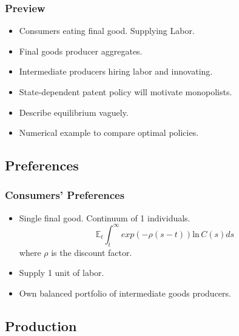 \documentclass{beamer}
\begin{document}
\begin{frame}[t]\frametitle{Preview}
    
\begin{itemize}
  \item<+-> Consumers eating final good. Supplying Labor.
  \item<+-> Final goods producer aggregates.
  \item<+-> Intermediate producers hiring labor and innovating.
  \item<+-> State-dependent patent policy will motivate monopolists.
  \item<+-> Describe equilibrium vaguely.
  \item<+-> Numerical example to compare optimal policies.
\end{itemize}
\end{frame}


\subsection{Preferences}
\label{sub:preferences}

\begin{frame}[t]\frametitle{Consumers' Preferences} 
  \begin{itemize}
	  \vspace{2mm}
    \item<+-> Single final good.  Continuum of 1 individuals.
      \begin{equation*} \label{eq:pref}
        \mathbb{E}_t \int_t^\infty exp(-\rho(s - t))\mathrm{ln}\,   C(s)ds
      \end{equation*}
      where $\rho$ is the discount factor.
  \vspace{2mm}
  \item<+-> Supply 1 unit of labor.
  \vspace{2mm}
  \item<+-> Own balanced portfolio of intermediate goods producers.
  \end{itemize}
\end{frame}

\subsection{Production}
\label{sub:production}
\end{document}
